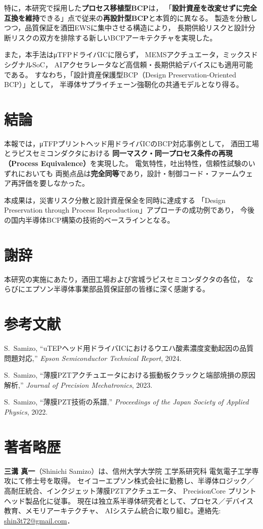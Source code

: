 \documentclass[conference]{IEEEtran}
\begin{document}
特に，本研究で採用した\textbf{プロセス移植型BCP}は，
「\textbf{設計資産を改変せずに完全互換を維持}できる」点で従来の\textbf{再設計型BCP}と本質的に異なる。
製造を分散しつつ，品質保証を酒田EWSに集中させる構造により，
長期供給リスクと設計分断リスクの双方を排除する新しいBCPアーキテクチャを実現した。

また，本手法はμTFPドライバICに限らず，
MEMSアクチュエータ，ミックスドシグナルSoC，
AIアクセラレータなど高信頼・長期供給デバイスにも適用可能である。
すなわち，「設計資産保護型BCP（Design Preservation-Oriented BCP）」として，
半導体サプライチェーン強靭化の共通モデルとなり得る。

\section{結論}
本報では，μTFPプリントヘッド用ドライバICのBCP対応事例として，
酒田工場とラピスセミコンダクタにおける
\textbf{同一マスク・同一プロセス条件の再現（Process Equivalence）}を実現した。
電気特性，吐出特性，信頼性試験のいずれにおいても
両拠点品は\textbf{完全同等}であり，設計・制御コード・ファームウェア再評価を要しなかった。

本成果は，災害リスク分散と設計資産保全を同時に達成する
「Design Preservation through Process Reproduction」アプローチの成功例であり，
今後の国内半導体BCP構築の技術的ベースラインとなる。

\section*{謝辞}
本研究の実施にあたり，酒田工場および宮城ラピスセミコンダクタの各位，
ならびにエプソン半導体事業部品質保証部の皆様に深く感謝する。

\section*{参考文献}
\begin{thebibliography}{99}
S.~Samizo, 
``uTEPヘッド用ドライバICにおけるウエハ酸素濃度変動起因の品質問題対応,'' 
\textit{Epson Semiconductor Technical Report}, 2024.

S.~Samizo, 
``薄膜PZTアクチュエータにおける振動板クラックと端部焼損の原因解析,'' 
\textit{Journal of Precision Mechatronics}, 2023.

S.~Samizo, 
``薄膜PZT技術の系譜,'' 
\textit{Proceedings of the Japan Society of Applied Physics}, 2022.
\end{thebibliography}

\section*{著者略歴}
\textbf{三溝 真一}（Shinichi Samizo）は、信州大学大学院 工学系研究科 電気電子工学専攻にて修士号を取得。
セイコーエプソン株式会社に勤務し、半導体ロジック／高耐圧統合、インクジェット薄膜PZTアクチュエータ、
PrecisionCore プリントヘッド製品化に従事。
現在は独立系半導体研究者として、プロセス／デバイス教育、メモリアーキテクチャ、
AIシステム統合に取り組む。連絡先: \href{mailto:shin3t72@gmail.com}{shin3t72@gmail.com}．
\end{document}
